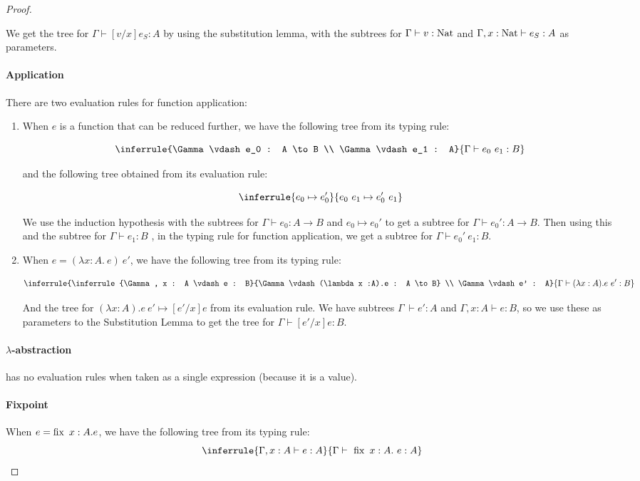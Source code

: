 \begin{proof}
\begin{enumerate}
{We get the tree for $\Gamma \vdash [v/x]e_S :  A$ by using the substitution lemma, with the subtrees for $\Gamma \vdash v :\operatorname{Nat}$ and $\Gamma , x : \operatorname{Nat} \vdash e_S : A$ as parameters.}
\end{enumerate}
\paragraph{Application} There are two evaluation rules for function application:
\begin{enumerate}
\item{When $e$ is a function that can be reduced further, we have the following tree from its typing rule: 

$$
\inferrule{\Gamma \vdash e_0 : A \to B \\  \Gamma \vdash e_1 : A}
  {\Gamma \vdash e_0 \ e_1 : B}
$$  

and the following tree obtained from its evaluation rule:

$$
\inferrule {e_0 \mapsto e_0'} {e_0 \ e_1 \mapsto e_0' \ e_1}
$$

We use the induction hypothesis with the subtrees for $\Gamma \vdash e_0 : A \to B$ and $e_0 \mapsto e_0'$ to get a subtree for $\Gamma \vdash e_0' : A \to B$. Then using this and the subtree for $\Gamma \vdash e_1 : B$ , in the typing rule for function application, we get a subtree for $\Gamma \vdash e_0' \ e_1 : B$. }
\item{When $e = (\lambda x: A .\ e) \ e'$, we have the following tree from its typing rule:

$$
\inferrule{\inferrule{\Gamma, x : A \vdash e : B}{\Gamma \vdash (\lambda x :A).e : A \to B} \\  \Gamma \vdash e' : A}
  {\Gamma \vdash (\lambda x :A).e \ e' : B}
$$  

And the tree for $(\lambda x :A).e \ e' \mapsto [e'/x]e$ from its evaluation rule. We have subtrees $\Gamma \ \vdash e' : A$ and $\Gamma, x : A \vdash e : B$, so we use these as parameters to the Substitution Lemma to get the tree for $\Gamma \vdash [e'/x]e : B$.}
\end{enumerate}

\paragraph{$\lambda$-abstraction} has no evaluation rules when taken as a single expression (because it is a value).

\paragraph{Fixpoint}
When $e = \operatorname{fix} \ x:A. e$, we have the following tree from its typing rule:
$$
\inferrule{\Gamma, x : A \vdash e : A }
  {\Gamma \vdash \  \fix \ x:A . \ e : A}
$$


\end{proof}
